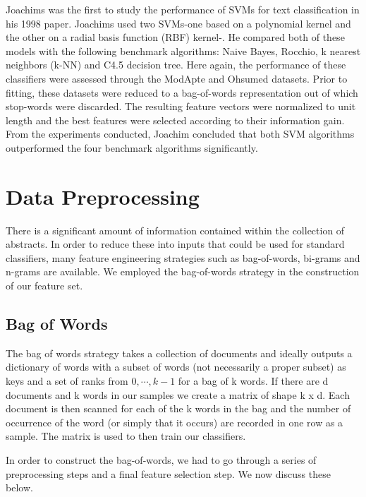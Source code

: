 \documentclass{acm_proc_article-sp}
\begin{document}
Joachims \cite{joachims98a} was the first to study the performance of SVMs for text classification in his 1998 paper. Joachims used two SVMs-one based on a polynomial kernel and the other on a radial basis function (RBF) kernel-. He compared both of these models with the following benchmark algorithms: Naive Bayes, Rocchio, k nearest neighbors (k-NN) and C4.5 decision tree. Here again, the performance of these classifiers were assessed through the ModApte and Ohsumed datasets. Prior to fitting, these datasets were reduced to a bag-of-words representation out of which stop-words were discarded. The resulting feature vectors were normalized to unit length and the best features were selected according to their information gain. From the experiments conducted, Joachim concluded that both SVM algorithms outperformed the four benchmark algorithms significantly.








\section{Data Preprocessing}
There is a significant amount of information contained within the collection of abstracts. In order to reduce these into inputs that could be used for standard classifiers, many feature engineering strategies such as bag-of-words, bi-grams and n-grams are available. We employed the bag-of-words strategy in the construction of our feature set. 

\subsection{Bag of Words}
The bag of words strategy takes a collection of documents and ideally outputs a dictionary of words with a subset of words (not necessarily a proper subset) as keys and a set of ranks from $0, \cdots, k-1$ for a bag of k words. If there are d documents and k words in our samples we create a matrix of shape k x d. Each document  is then scanned for each of the k words in the bag and the number of occurrence of the word (or simply that it occurs)  are recorded in one row as a sample. The matrix is used to then train our classifiers.

In order to construct the bag-of-words, we had to go through a series of preprocessing steps and a final feature selection step. We now discuss these below.
\end{document}
